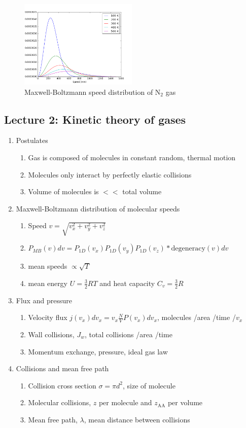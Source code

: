 \documentclass[11pt]{article}
\begin{document}
\begin{figure}[htbp]
\centering
\includegraphics[width=0.5\textwidth]{./Images/MB.png}
\caption{Maxwell-Boltzmann speed distribution of N\(_2\) gas}
\end{figure}

\subsection{Lecture 2: Kinetic theory of gases}
\label{sec:org7f12785}
\begin{enumerate}
\item Postulates
\begin{enumerate}
\item Gas is composed of molecules in constant random, thermal motion
\item Molecules only interact by perfectly elastic collisions
\item Volume of molecules is \(<<\) total volume
\end{enumerate}
\item Maxwell-Boltzmann distribution of molecular speeds
\begin{enumerate}
\item Speed \(v=\sqrt{v_x^2+v_y^2+v_z^2}\)
\item \(P_{MB}(v) dv = P_{1D}(v_x) P_{1D}(v_y) P_{1D}(v_z) * \text{degeneracy}(v) dv\)
\item mean speeds \(\propto \sqrt{T}\)
\item mean energy \(U=\frac{3}{2} RT\) and heat capacity \(C_v=\frac{3}{2} R\)
\end{enumerate}
\item Flux and pressure
\begin{enumerate}
\item Velocity flux \(j(v_x) dv_x= v_x \frac{N}{V}P(v_x)dv_x\), molecules /area /time /\(v_x\)
\item Wall collisions, \(J_w\), total collisions /area /time
\item Momentum exchange, pressure, ideal gas law
\end{enumerate}
\item Collisions and mean free path
\begin{enumerate}
\item Collision cross section \(\sigma=\pi d^2\), size of molecule
\item Molecular collisions, \(z\) per molecule and \(z_{\mathrm{AA}}\) per volume
\item Mean free path, \(\lambda\), mean distance between collisions
\end{enumerate}
\end{enumerate}
\end{document}
